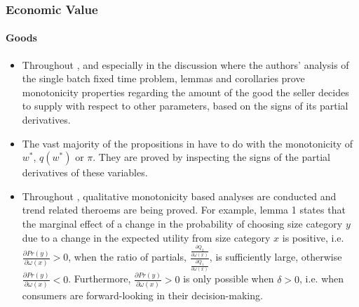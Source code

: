 \documentclass[11pt]{book}
\begin{document}
\subsubsection{Economic Value}
\paragraph{Goods}
\begin{itemize}
\item Throughout \cite{van2017economic},
and especially in the discussion where the authors' analysis of the
single batch fixed time problem, lemmas and corollaries prove monotonicity
properties regarding the amount of the good the seller decides to
supply with respect to other parameters, based on the signs of its
partial derivatives.
\item The vast majority of the propositions in \cite{matsushima2017expanding}
have to do with the monotonicity of $w^{*}$, $q\left(w^{*}\right)$
or $\pi$. They are proved by inspecting the signs of the partial
derivatives of these variables.
\item Throughout \cite{liao2021essays},
qualitative monotonicity based analyses are conducted and trend related
theroems are being proved. For example, lemma 1 states that the marginal
effect of a change in the probability of choosing size category $y$
due to a change in the expected utility from size category $x$ is
positive, i.e. $\frac{\partial Pr(y)}{\partial\omega\left(x\right)}>0$,
when the ratio of partials, $\frac{\frac{\partial Q_{2}}{\partial\omega\left(x\right)}}{\frac{\partial Q_{1}}{\partial\omega\left(x\right)}}$,
is sufficiently large, otherwise $\frac{\partial Pr(y)}{\partial\omega\left(x\right)}<0$.
Furthermore, $\frac{\partial Pr(y)}{\partial\omega\left(x\right)}>0$
is only possible when $\delta>0$, i.e. when consumers are forward-looking
in their decision-making.
\end{itemize}
\end{document}
